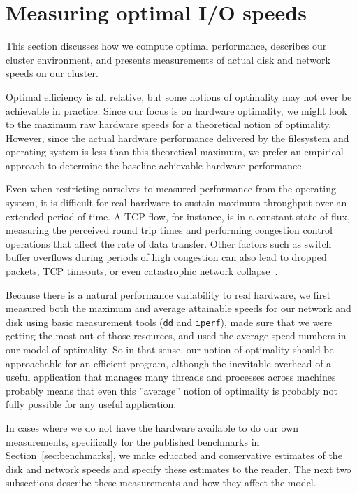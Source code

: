 \section{Measuring optimal I/O speeds}
\label{sec:optimality}

This section discusses how we compute optimal performance, describes
our cluster environment, and presents measurements of actual disk and
network speeds on our cluster.

 Optimal efficiency is all
relative, but some notions of optimality may not ever be achievable in
practice.  Since our focus is on hardware optimality, we might look to
the maximum raw hardware speeds for a theoretical notion of
optimality.  However, since the actual hardware performance delivered
by the filesystem and operating system is less than this theoretical
maximum, we prefer an empirical approach to determine the baseline
achievable hardware performance.

Even when restricting ourselves to measured performance from the
operating system, it is difficult for real hardware to sustain maximum
throughput over an extended period of time.  A TCP flow, for instance,
is in a constant state of flux, measuring the perceived round trip
times and performing congestion control operations that affect the
rate of data transfer.  Other factors such as switch buffer overflows
during periods of high congestion can also lead to dropped packets,
TCP timeouts, or even catastrophic network collapse~\cite{incast}.

Because there is a natural performance variability to real hardware,
we first measured both the maximum and average attainable speeds for
our network and disk using basic measurement tools (\texttt{dd} and
\texttt{iperf}), made sure that we were getting the most out of those
resources, and used the average speed numbers in our model of
optimality.  So in that sense, our notion of optimality should be
approachable for an efficient program, although the inevitable
overhead of a useful application that manages many threads and
processes across machines probably means that even this ''average''
notion of optimality is probably not fully possible for any useful
application.

In cases where we do not have the hardware available to do our own
measurements, specifically for the published benchmarks in
Section~\ref{sec:benchmarks}, we make educated and conservative
estimates of the disk and network speeds and specify these estimates
to the reader.  The next two subsections describe these measurements and
how they affect the model.

